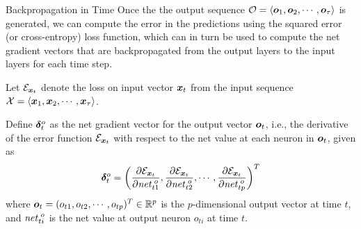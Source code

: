 \begin{frame}{Backpropagation in Time}
Once the the output sequence ${\mathcal O} = \langle {\boldsymbol o}_1,
{\boldsymbol o}_2, \cdots, {\boldsymbol o}_\tau \rangle$ is generated, we can compute the error in the predictions 
using the squared error
(or cross-entropy) loss function, which can in turn be used to compute the
net gradient vectors that are backpropagated from the output layers to the
input layers for each time step.


\medskip


Let ${\mathcal E}_{{\boldsymbol x}_t}$ denote the loss on input vector ${\boldsymbol x}_t$ from the input
sequence ${\mathcal X} = \langle {\boldsymbol x}_1, {\boldsymbol x}_2, \cdots, {\boldsymbol x}_\tau \rangle$.


\medskip

Define ${\bm \delta}^o_t$ as the net gradient vector for the output vector
${\boldsymbol o}_t$, i.e., the
derivative of the error function ${\mathcal E}_{{\boldsymbol x}_t}$
with respect to the net value at each neuron in ${\boldsymbol o}_t$, given as
\begin{align*}
    {\bm \delta}^o_t = \left(
        \frac{\partial {\mathcal E}_{{\boldsymbol x}_t}}{\partial \mathit{net}^{\;o}_{t1}},
        \frac{\partial {\mathcal E}_{{\boldsymbol x}_t}}{\partial \mathit{net}^{\;o}_{t2}},
                \cdots,
                \frac{\partial {\mathcal E}_{{\boldsymbol x}_t}}{\partial \mathit{net}^{\;o}_{tp}}
    \right)^T
\end{align*}
where ${\boldsymbol o}_t = (o_{t1}, o_{t2}, \cdots, o_{tp})^T \in {\mathord{\mathbb R}}^p$ is the
$p$-dimensional output vector at time $t$, and $\mathit{net}^{\;o}_{ti}$ is
the net value at output neuron $o_{ti}$ at time $t$.
\end{frame}

